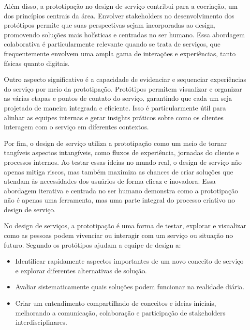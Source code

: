 Além disso, a prototipação no design de serviço contribui para a cocriação, um dos princípios centrais da área. Envolver stakeholders no desenvolvimento dos protótipos permite que suas perspectivas sejam incorporadas ao design, promovendo soluções mais holísticas e centradas no ser humano. Essa abordagem colaborativa é particularmente relevante quando se trata de serviços, que frequentemente envolvem uma ampla gama de interações e experiências, tanto físicas quanto digitais.

Outro aspecto significativo é a capacidade de evidenciar e sequenciar experiências do serviço por meio da prototipação. Protótipos permitem visualizar e organizar as várias etapas e pontos de contato do serviço, garantindo que cada um seja projetado de maneira integrada e eficiente. Isso é particularmente útil para alinhar as equipes internas e gerar insights práticos sobre como os clientes interagem com o serviço em diferentes contextos.

Por fim, o design de serviço utiliza a prototipação como um meio de tornar tangíveis aspectos intangíveis, como fluxos de experiência, jornadas do cliente e processos internos. Ao testar essas ideias no mundo real, o design de serviço não apenas mitiga riscos, mas também maximiza as chances de criar soluções que atendam às necessidades dos usuários de forma eficaz e inovadora. Essa abordagem iterativa e centrada no ser humano demonstra como a prototipação não é apenas uma ferramenta, mas uma parte integral do processo criativo no design de serviço.

No design de serviços, a prototipação é uma forma de testar, explorar e visualizar como as pessoas podem vivenciar ou interagir com um serviço ou situação no futuro. Segundo \cite{Stickdorn2019} os protótipos ajudam a equipe de design a: 

\begin{itemize}
	\item Identificar rapidamente aspectos importantes de um novo conceito de serviço e explorar diferentes alternativas de solução.
	
	\item Avaliar sistematicamente quais soluções podem funcionar na realidade diária.
	
	\item Criar um entendimento compartilhado de conceitos e ideias iniciais, melhorando a comunicação, colaboração e participação de stakeholders interdisciplinares.
\end{itemize}

